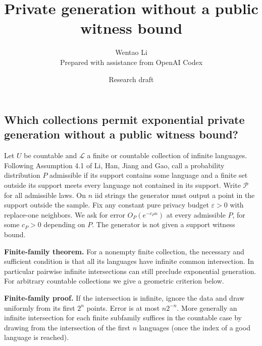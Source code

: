 \documentclass[11pt]{article}
\title{Private generation without a public witness bound}
\author{Wentao Li\\{\small Prepared with assistance from OpenAI Codex}}
\date{Research draft}
\begin{document}
\maketitle
\subsection{Which collections permit exponential private generation without a public witness bound?}\label{which-collections-permit-exponential-private-generation-without-a-public-witness-bound}

Let \(U\) be countable and \(\mathcal L\) a finite or countable collection of infinite languages. Following Assumption 4.1 of Li, Han, Jiang and Gao, call a probability distribution \(P\) admissible if its support contains some language and a finite set outside its support meets every language not contained in its support. Write \(\mathcal P\) for all admissible laws. On \(n\) iid strings the generator must output a point in the support outside the sample. Fix any constant pure privacy budget \(\varepsilon>0\) with replace-one neighbors. We ask for error \(O_P(e^{-c_Pn})\) at every admissible \(P\), for some \(c_P>0\) depending on \(P\). The generator is not given a support witness bound.

\textbf{Finite-family theorem.} For a nonempty finite collection, the necessary and sufficient condition is that all its languages have infinite common intersection. In particular pairwise infinite intersections can still preclude exponential generation. For arbitrary countable collections we give a geometric criterion below.

\textbf{Finite-family proof.} If the intersection is infinite, ignore the data and draw uniformly from its first \(2^n\) points. Error is at most \(n2^{-n}\). More generally an infinite intersection for each finite subfamily suffices in the countable case by drawing from the intersection of the first \(n\) languages (once the index of a good language is reached).
\end{document}
